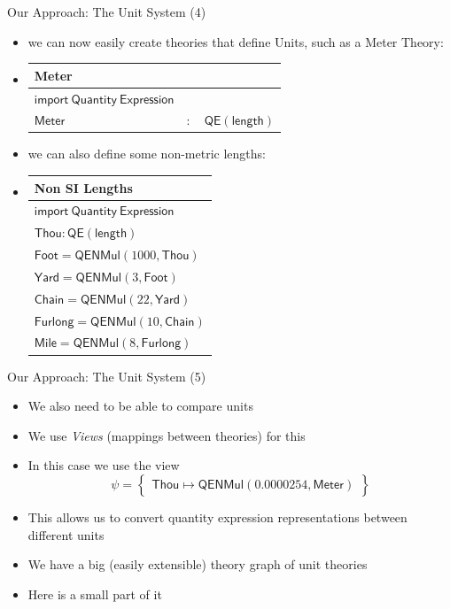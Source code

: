 \documentclass{beamer}
\begin{document}
  \begin{frame}{Our Approach: The Unit System (4)}
    \begin{itemize}[<+->]
      \item we can now easily create theories that define Units, such as a Meter Theory:
      \item
          \begin{tabular}{|l l l|}
            \hline
            \textsf{Meter} &&\\\hline
            $ \mathsf{import \ Quantity\ Expression}$ &&\\
            \hline
            $\mathsf{Meter}$ & $:$ & $ \mathsf{QE} \left( \mathsf{length} \right)$\\\hline
          \end{tabular}
    \item we can also define some non-metric lengths:
    \item
      \begin{tabular}{|l|}
        \hline
        \textsf{Non SI Lengths}\\\hline
        $ \mathsf{import \ Quantity\ Expression}$\\
        \hline
        $\mathsf{Thou} : \mathsf{QE}\left( \mathsf{length} \right)$\\
        $\mathsf{Foot} = \mathsf{QENMul} \left( 1000, \mathsf{Thou} \right)$\\
        $\mathsf{Yard} = \mathsf{QENMul} \left( 3, \mathsf{Foot} \right)$\\
        $\mathsf{Chain} = \mathsf{QENMul} \left( 22, \mathsf{Yard} \right)$\\
        $\mathsf{Furlong} = \mathsf{QENMul} \left( 10, \mathsf{Chain} \right)$\\
        $\mathsf{Mile} = \mathsf{QENMul} \left( 8, \mathsf{Furlong} \right)$\\
        \hline
      \end{tabular}
    \end{itemize}
  \end{frame}

  \begin{frame}{Our Approach: The Unit System (5)}
    \begin{itemize}[<+->]
      \item We also need to be able to compare units
      \item We use \textit{Views} (mappings between theories) for this
      \item In this case we use the view
        \[
          \psi = \left\{\begin{array}{l}
            \mathsf{Thou} \mapsto \mathsf{QENMul} \left( 0.0000254, \mathsf{Meter} \right)
          \end{array}\right\}
        \]
      \item This allows us to convert quantity expression representations between different units
      \item We have a big (easily extensible) theory graph of unit theories
      \item Here is a small part of it
    \end{itemize}
  \end{frame}
\end{document}
